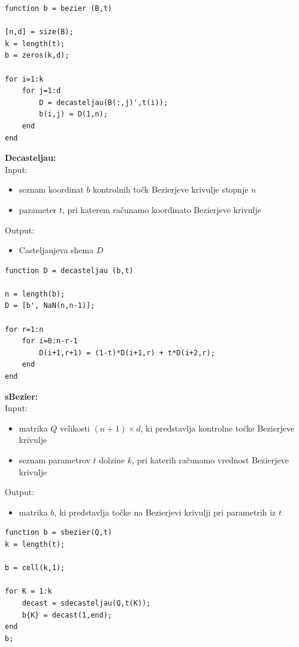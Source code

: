 \documentclass[12pt,a4paper,twoside]{article}
\theoremstyle{definition} %
\theoremstyle{plain} %
\numberwithin{equation}{section}  %
\begin{document}
\begin{lstlisting}[caption = {bezier}]
function b = bezier (B,t)

[n,d] = size(B);
k = length(t);
b = zeros(k,d);

for i=1:k
    for j=1:d
        D = decasteljau(B(:,j)',t(i));
        b(i,j) = D(1,n);
    end
end
\end{lstlisting}

\vspace{1cm}
\textbf{Decasteljau:}\\
Input:
\begin{itemize}
\item seznam koordinat $b$ kontrolnih točk Bezierjeve krivulje stopnje $n$
\item parameter $t$, pri katerem računamo koordinato Bezierjeve krivulje
\end{itemize}
Output:
\begin{itemize}
\item Casteljaujeva shema $D$
\end{itemize}

\begin{lstlisting}[caption = {decasteljau}]
function D = decasteljau (b,t) 

n = length(b);
D = [b', NaN(n,n-1)];

for r=1:n
    for i=0:n-r-1
        D(i+1,r+1) = (1-t)*D(i+1,r) + t*D(i+2,r);
    end
end
\end{lstlisting}

\newpage

\textbf{sBezier:}\\
Input:
\begin{itemize}
\item matrika $Q$ velikosti $(n+1) \times d$, ki predstavlja kontrolne točke Bezierjeve krivulje
\item seznam parametrov $t$ dolzine $k$, pri katerih računamo vrednost Bezierjeve krivulje
\end{itemize}
Output:
\begin{itemize}
\item matrika $b$, ki predstavlja točke na Bezierjevi krivulji pri parametrih iz $t$
\end{itemize}

\begin{lstlisting}[caption = {sbezier}]
function b = sbezier(Q,t)
k = length(t);

b = cell(k,1);

for K = 1:k
    decast = sdecasteljau(Q,t(K));
    b{K} = decast(1,end);
end
b;
\end{lstlisting}
\end{document}
